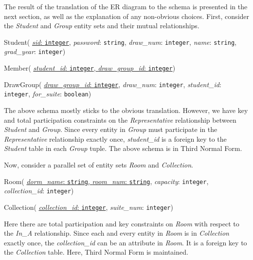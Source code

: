 The result of the translation of the ER diagram to the schema is presented in
the next section, as well as the explanation of any non-obvious choices. First,
consider the \emph{Student} and \emph{Group} entity sets and their mutual
relationships.

\begin{description}
  \item Student(
        \ul{\emph{sid}: \texttt{integer}},
        \emph{password}: \texttt{string},
        \emph{draw\_num}: \texttt{integer},
        \emph{name}: \texttt{string},
        \emph{grad\_year}: \texttt{integer})

  \item Member(
        \ul{\emph{student\_id}: \texttt{integer},
        \emph{draw\_group\_id}: \texttt{integer}})

  \item DrawGroup(
        \ul{\emph{draw\_group\_id}: \texttt{integer}},
        \emph{draw\_num}: \texttt{integer},
        \emph{student\_id}: \texttt{integer},
        \emph{for\_suite}: \texttt{boolean})
\end{description}

The above schema mostly sticks to the obvious translation.  However, we have key
and total participation constraints on the \emph{Representative}
relationship between \emph{Student} and \emph{Group}. Since every entity in
\emph {Group} must participate in the \emph{Representative} relationship exactly
once, \emph{student\_id} is a foreign key to the \emph{Student} table in each
\emph{Group} tuple. The above schema is in Third Normal Form.

Now, consider a parallel set of entity sets \emph{Room} and \emph{Collection}.

\begin{description}
  \item Room(
        \ul{\emph{dorm\_name}: \texttt{string},
        \emph{room\_num}: \texttt{string}},
        \emph{capacity}: \texttt{integer},
        \emph{collection\_id}: \texttt{integer})

  \item Collection(
        \ul{\emph{collection\_id}: \texttt{integer}},
        \emph{suite\_num}: \texttt{integer})
\end{description}

Here there are total participation and key constraints on \emph{Room} with
respect to the \emph{In\_A} relationship.  Since each and every entity in
\emph{Room} is in \emph{Collection} exactly once, the \emph{collection\_id} can 
be an attribute in \emph{Room}. It is a foreign key to the
\emph{Collection} table. Here, Third Normal Form is maintained.

